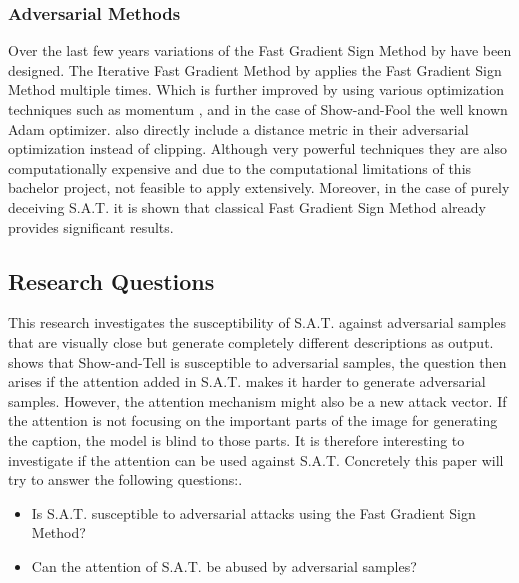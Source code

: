 \subsubsection*{Adversarial Methods}
Over the last few years variations of the Fast Gradient Sign Method by \cite{goodfellow2015explaining} have been designed. The Iterative Fast Gradient Method by \citeauthor{Kurakin} applies the Fast Gradient Sign Method multiple times. Which is further improved by using various optimization techniques such as momentum \cite{9237700}, and in the case of Show-and-Fool the well known Adam\cite{kingma2017adam} optimizer. \citeauthor{EvaluatingRobustness} also directly include a distance metric in their adversarial optimization instead of clipping. Although very powerful techniques they are also computationally expensive and due to the computational limitations of this bachelor project, not feasible to apply extensively. Moreover, in the case of purely deceiving S.A.T. it is shown that classical Fast Gradient Sign Method already provides significant results.

\subsection{Research Questions}
This research investigates the susceptibility of S.A.T. against adversarial samples that are visually close but generate completely different descriptions as output. \citeauthor{Hongge} shows that Show-and-Tell is susceptible to adversarial samples, the question then arises if the attention added in S.A.T. makes it harder to generate adversarial samples. However, the attention mechanism might also be a new attack vector. If the attention is not focusing on the important parts of the image for generating the caption, the model is blind to those parts. It is therefore interesting to investigate if the attention can be used against S.A.T.
Concretely this paper will try to answer the following questions:.
\begin{itemize}
    \item Is S.A.T. susceptible to adversarial attacks using the Fast Gradient Sign Method?
    \item Can the attention of S.A.T. be abused by adversarial samples?
\end{itemize}
